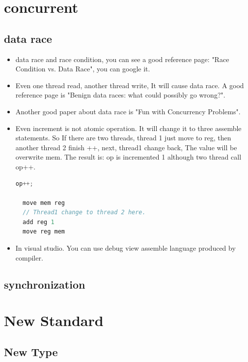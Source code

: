 \documentclass[a4paper,12pt,twoside]{book}
\begin{document}
\section{concurrent}
\subsection{data race}
\begin{itemize}
\item data race and race condition, you can see a good reference page: "Race Condition vs. Data Race", you can google it.

\item Even one thread read, another thread write, It will cause data race. A good reference page is "Benign data races: what could possibly go wrong?". 

\item Another good paper about data race is "Fun with Concurrency Problems".

\item Even increment is not atomic operation. It will change it to three assemble statements. So If there are two threads, thread 1 just move to reg, then another thread 2 finish ++, next, thread1 change back, The value will be overwrite mem. The result is: op is incremented 1 although two thread call op++.
\begin{lstlisting}[frame=single, language=c++]
  op++;
  
  move mem reg
  // Thread1 change to thread 2 here. 
  add reg 1
  move reg mem
\end{lstlisting}

\item In visual studio. You can use debug view assemble language produced by compiler. 
\end{itemize}

\subsection{synchronization}

\section{New Standard}

\subsection{New Type}
\end{document}
